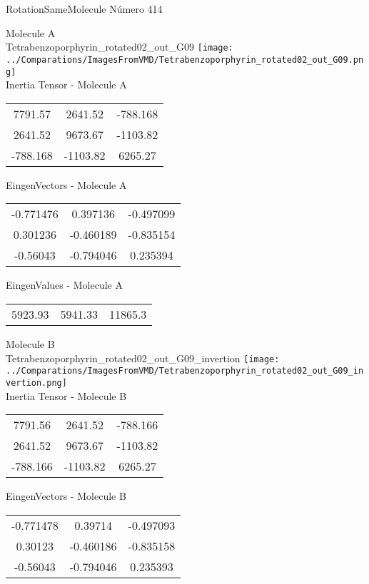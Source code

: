  \newpage

\vtab[-2cm]
\begin{center}
{\large RotationSameMolecule \tab Número 414}
\end{center}
\begin{multicols}{2}
\begin{center}

Molecule A \\ 
Tetrabenzoporphyrin\_rotated02\_out\_G09
\texttt{[image: ../Comparations/ImagesFromVMD/Tetrabenzoporphyrin\_rotated02\_out\_G09.png]}
\\
Inertia Tensor - Molecule A \\
\vtab

\begin{tabular}{|c c c|}
7791.57	 & 	2641.52	 & 	-788.168	 \\
2641.52	 & 	9673.67	 & 	-1103.82	 \\
-788.168	 & 	-1103.82	 & 	6265.27
\end{tabular}

\vtab
 EingenVectors - Molecule A     \\
\vtab
\begin{tabular}{|c c c|}
-0.771476	 & 	0.397136	 & 	-0.497099	 \\
0.301236	 & 	-0.460189	 & 	-0.835154	 \\
-0.56043	 & 	-0.794046	 & 	0.235394
\end{tabular}

\vtab
 EingenValues - Molecule A     \\
\vtab
\begin{tabular}{|c c c|}
5923.93	 & 	5941.33	 & 	11865.3	 \\
\end{tabular}
\columnbreak

Molecule B \\ 
Tetrabenzoporphyrin\_rotated02\_out\_G09\_invertion
\texttt{[image: ../Comparations/ImagesFromVMD/Tetrabenzoporphyrin\_rotated02\_out\_G09\_invertion.png]}
\\
Inertia Tensor - Molecule B \\
\vtab

\begin{tabular}{|c c c|}
7791.56	 & 	2641.52	 & 	-788.166	 \\
2641.52	 & 	9673.67	 & 	-1103.82	 \\
-788.166	 & 	-1103.82	 & 	6265.27
\end{tabular}

\vtab
 EingenVectors - Molecule B     \\
\vtab
\begin{tabular}{|c c c|}
-0.771478	 & 	0.39714	 & 	-0.497093	 \\
0.30123	 & 	-0.460186	 & 	-0.835158	 \\
-0.56043	 & 	-0.794046	 & 	0.235393
\end{tabular}


\end{center}
\end{multicols}
